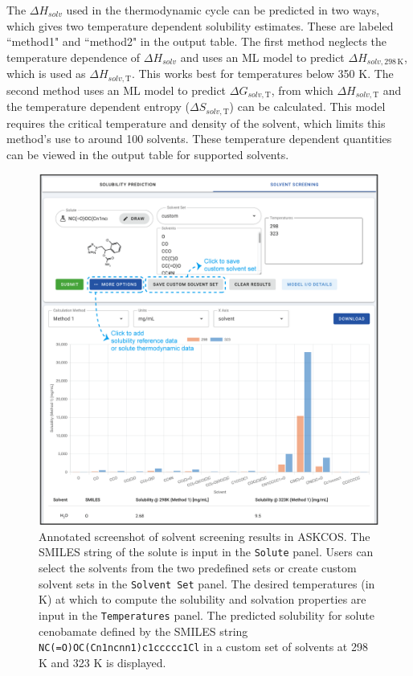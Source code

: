 \documentclass[pdflatex,sn-mathphys-num]{sn-jnl}%
\theoremstyle{thmstyleone}%
\theoremstyle{thmstyletwo}%
\theoremstyle{thmstylethree}%
\begin{document}
The $\Delta H_{solv}$ used in the thermodynamic cycle can be predicted in two ways, which gives two temperature dependent solubility estimates. These are labeled ``method1" and ``method2" in the output table. The first method neglects the temperature dependence of $\Delta H_{solv}$ and uses an ML model to predict $\Delta H_{solv, 298\, \mathrm{K}}$, which is used as $\Delta H_{solv,\mathrm{T}}$. This works best for temperatures below 350 K. The second method uses an ML model to predict $\Delta G_{solv, \mathrm{T}}$, from which $\Delta H_{solv, \mathrm{T}}$ and the temperature dependent entropy ($\Delta S_{solv, \mathrm{T}}$) can be calculated. This model requires the critical temperature and density of the solvent, which limits this method's use to around 100 solvents. These temperature dependent quantities can be viewed in the output table for supported solvents. 

\begin{figure}[h!]
\centering
\includegraphics[width=1.0\textwidth]{media/S2.Solvent_screening.png}
\caption{Annotated screenshot of solvent screening results in ASKCOS. The SMILES string of the solute is input in the \texttt{Solute} panel. Users can select the solvents from the two predefined sets or create custom solvent sets in the \texttt{Solvent Set} panel. The desired temperatures (in K) at which to compute the solubility and solvation properties are input in the \texttt{Temperatures} panel. The predicted solubility for solute cenobamate defined by the SMILES string \texttt{NC(=O)OC(Cn1ncnn1)c1ccccc1Cl} in a custom set of solvents at 298 K and 323 K is displayed. }\label{fig_solvent_screening}
\end{figure}
\end{document}

